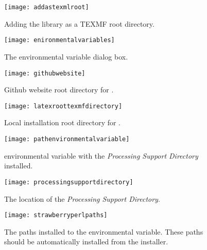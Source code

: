 \begin{figure}
	\centering
	\texttt{[image: addastexmlroot]}
	\caption[Adding the library as a TEXMF root directory]{Adding the library as a TEXMF root directory.}
	\label{fig:addastexmlroot}
\end{figure}

\begin{figure}
	\centering
	\texttt{[image: enironmentalvariables]}
	\caption[The environmental variable dialog box]{The environmental variable dialog box.}
	\label{fig:enironmentalvariables}
\end{figure}


\begin{figure}
	\centering
	\texttt{[image: githubwebsite]}
	\caption[Github website root directory]{Github website root directory for \lelatex{}.}
	\label{fig:githubwebsite}
\end{figure}

\begin{figure}
	\centering
	\texttt{[image: latexroottexmfdirectory]}
	\caption[Local installation root directory for \lelatex{}]{Local installation root directory for \lelatex{}.}
	\label{fig:latexroottexmfdirectory}
\end{figure}

\begin{figure}
	\centering
	\texttt{[image: pathenvironmentalvariable]}
	\caption[\pathenvvar{} environmental variable with the \emph{Processing Support Directory} installed]{\pathenvvar{} environmental variable with the \emph{Processing Support Directory} installed.}
	\label{fig:pathenvironmentalvariable}
\end{figure}

\begin{figure}
	\centering
	\texttt{[image: processingsupportdirectory]}
	\caption[The location of the \emph{Processing Support Directory}]{The location of the \emph{Processing Support Directory}.}
	\label{fig:processingsupportdirectory}
\end{figure}

\begin{figure}
	\centering
	\texttt{[image: strawberryperlpaths]}
	\caption[The \strawberryperl{} paths installed to the \pathenvvar{} environmental variable]{The \strawberryperl{} paths installed to the \pathenvvar{} environmental variable.  These paths should be automatically installed from the \strawberryperl{} installer.}
	\label{fig:strawberryperlpaths}
\end{figure} 